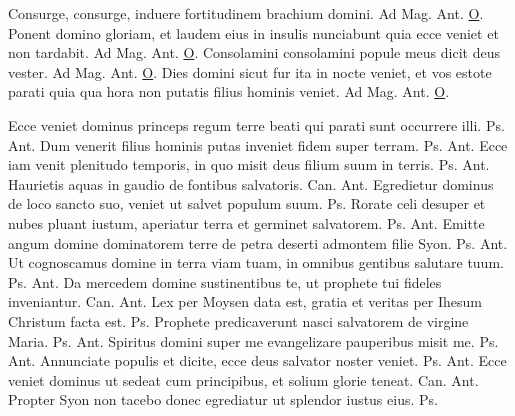 \begin{multicols*}{2}
 Consurge, consurge, induere fortitudinem brachium domini. {\color{Red} Ad Mag. Ant.} \hyperlink{o-antiphons}{O}.
 Ponent domino gloriam, et laudem eius in insulis nunciabunt quia ecce veniet et non tardabit. {\color{Red} Ad Mag. Ant.} \hyperlink{o-antiphons}{O}.
 Consolamini consolamini popule meus dicit deus vester. {\color{Red} Ad Mag. Ant.} \hyperlink{o-antiphons}{O}.
 Dies domini sicut fur ita in nocte veniet, et vos estote parati quia qua hora non putatis filius hominis veniet. {\color{Red} Ad Mag. Ant.} \hyperlink{o-antiphons}{O}.
{\color{Red} }
\par {} Ecce veniet dominus princeps regum terre beati qui parati sunt occurrere illi. {\color{Red} Ps.}  {\color{Red} Ant.} Dum venerit filius hominis putas inveniet fidem super terram. {\color{Red} Ps.}  {\color{Red} Ant.} Ecce iam venit plenitudo temporis, in quo misit deus filium suum in terris. {\color{Red} Ps.}  {\color{Red} Ant.} Haurietis aquas in gaudio de fontibus salvatoris. {\color{Red} Can.}  {\color{Red} Ant.} Egredietur dominus de loco sancto suo, veniet ut salvet populum suum. {\color{Red} Ps.} 
 Rorate celi desuper et nubes pluant iustum, aperiatur terra et germinet salvatorem. {\color{Red} Ps.}  {\color{Red} Ant.} Emitte angum domine dominatorem terre de petra deserti admontem filie Syon. {\color{Red} Ps.}  {\color{Red} Ant.} Ut cognoscamus domine in terra viam tuam, in omnibus gentibus salutare tuum. {\color{Red} Ps.}  {\color{Red} Ant.} Da mercedem domine sustinentibus te, ut prophete tui fideles inveniantur. {\color{Red} Can.}  {\color{Red} Ant.} Lex per Moysen data est, gratia et veritas per Ihesum Christum facta est. {\color{Red} Ps.} 
 Prophete predicaverunt nasci salvatorem de virgine Maria. {\color{Red} Ps.}  {\color{Red} Ant.} Spiritus domini super me evangelizare pauperibus misit me. {\color{Red} Ps.}  {\color{Red} Ant.} Annunciate populis et dicite, ecce deus salvator noster veniet. {\color{Red} Ps.}  {\color{Red} Ant.} Ecce veniet dominus ut sedeat cum principibus, et solium glorie teneat. {\color{Red} Can.}  {\color{Red} Ant.} Propter Syon non tacebo donec egrediatur ut splendor iustus eius. {\color{Red} Ps.} 

\end{multicols*}

